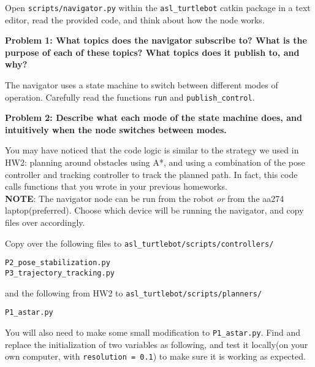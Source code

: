 \documentclass{article}
\begin{document}




Open \texttt{scripts/navigator.py} within the \texttt{asl\_turtlebot} catkin package in a text editor, read the provided code, and think about how the node works.

\textbf{Problem 1: What topics does the navigator subscribe to? What is the purpose of each of these topics? What topics does it publish to, and why?}

The navigator uses a state machine to switch between different modes of operation. Carefully read the functions \texttt{run} and \texttt{publish\_control}.

\textbf{Problem 2: Describe what each mode of the state machine does, and intuitively when the node switches between modes.}

You may have noticed that the code logic is similar to the strategy we used in HW2: planning around obstacles using A*, and using a combination of the pose controller and tracking controller to track the planned path. In fact, this code calls functions that you wrote in your previous homeworks. 
\\
\textbf{NOTE}: The navigator node can be run from the robot \textit{or} from the aa274 laptop(preferred). Choose which device will be running the navigator, and copy files over accordingly.

Copy over the following files to \texttt{asl\_turtlebot/scripts/controllers/}

\begin{lstlisting}
P2_pose_stabilization.py
P3_trajectory_tracking.py
\end{lstlisting}

and the following from HW2 to \texttt{asl\_turtlebot/scripts/planners/}

\begin{lstlisting}
P1_astar.py
\end{lstlisting}

You will also need to make some small modification to {\tt P1\_astar.py}. Find and replace the initialization of two variables as following, and test it locally(on your own computer, with \texttt{resolution = 0.1}) to make sure it is working as expected.
\end{document}
